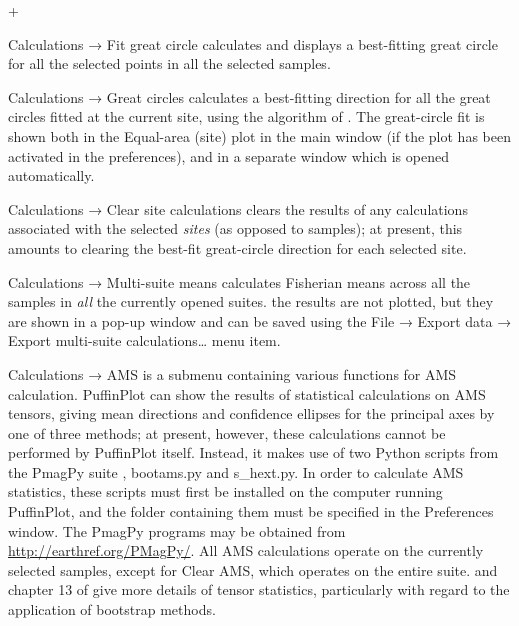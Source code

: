 \documentclass[a4paper,british]{article}
\newcommand{\menuitemlabel}[1]{%
\mbox{\textsf{#1}}\hfil}
\newenvironment{menuitemlist}%
{\begin{list}{}{%
\renewcommand{\makelabel}{\menuitemlabel}%
\setlength{\labelwidth}{35pt}%
\setlength{\leftmargin}%
             {\labelwidth+\labelsep}}}%
{\end{list}}
\newcommand{\ppcmd}[1]{\textsf{#1}} %
\newcommand{\caps}[1]{\MakeTextUppercase{#1}} %
\newcommand{\submenu}{ \textrm{→} }
\begin{document}
\begin{menuitemlist}
\item[Calculations\submenu Fit great circle] calculates and displays a
  best-fitting great circle for all the selected points in all the selected
  samples.

\item[Calculations\submenu Great circles] calculates a best-fitting direction
  for all the great circles fitted at the current site, using the algorithm
  of \cite{mcfadden1988circles}. The great-circle fit is shown both in the
  \ppcmd{Equal-area (site)} plot in the main window (if the plot has been
  activated in the preferences), and in a separate window which is opened
  automatically.

\item[Calculations\submenu Clear site calculations] clears the results of any
  calculations associated with the selected {\em sites} (as opposed to
  samples); at present, this amounts to clearing the best-fit great-circle
  direction for each selected site.

\item[Calculations\submenu Multi-suite means] calculates Fisherian means
  across all the samples in \emph{all} the currently opened suites. the
  results are not plotted, but they are shown in a pop-up window and can be
  saved using the \ppcmd{File\submenu Export data\submenu Export multi-suite
    calculations\ldots} menu item.

\item[Calculations\submenu \caps{ams}] is a submenu containing various
  functions for \caps{ams} calculation. PuffinPlot can show the results
  of statistical calculations on \caps{ams} tensors, giving mean
  directions and confidence ellipses for the principal axes by one of
  three methods; at present, however, these calculations cannot be
  performed by PuffinPlot itself. Instead, it makes use of two Python
  scripts from the PmagPy suite \citep{tauxe2010paleomagnetism},
  \ppcmd{bootams.py} and \ppcmd{s\_hext.py}. In order to calculate
  \caps{ams} statistics, these scripts must first be installed on the
  computer running PuffinPlot, and the folder containing them must be
  specified in the \ppcmd{Preferences} window. The PmagPy programs may
  be obtained from \url{http://earthref.org/PMagPy/}. All \caps{ams}
  calculations operate on the currently selected samples, except for
  \ppcmd{Clear \caps{ams}}, which operates on the entire suite.
  \cite{tauxe1998directions} and chapter 13 of
  \cite{tauxe2010paleomagnetism} give more details of tensor statistics,
  particularly with regard to the application of bootstrap methods.


\end{menuitemlist}
\end{document}
